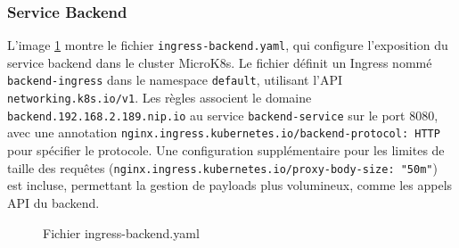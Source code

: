 \subsubsection{Service Backend}
L'image \ref{fig:backing} montre le fichier \texttt{ingress-backend.yaml}, qui configure l’exposition du service backend dans le cluster MicroK8s. Le fichier définit un Ingress nommé \texttt{backend-ingress} dans le namespace \texttt{default}, utilisant l’API \texttt{networking.k8s.io/v1}. Les règles associent le domaine \texttt{backend.192.168.2.189.nip.io} au service \texttt{backend-service} sur le port 8080, avec une annotation \texttt{nginx.ingress.kubernetes.io/backend-protocol: HTTP} pour spécifier le protocole. Une configuration supplémentaire pour les limites de taille des requêtes (\texttt{nginx.ingress.kubernetes.io/proxy-body-size: "50m"}) est incluse, permettant la gestion de payloads plus volumineux, comme les appels API du backend.
\newpage
\begin{figure}[h]
    \vspace*{-2cm}
    \begin{adjustwidth}{-3.5cm}{-3.5cm}
    \centering
    \caption{Fichier ingress-backend.yaml}
    \label{fig:backing}
    \end{adjustwidth}
\end{figure}

